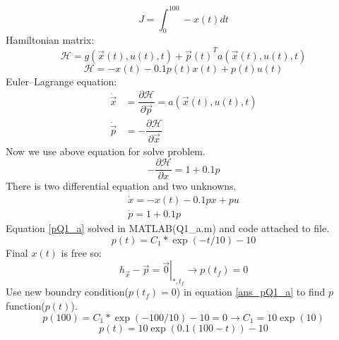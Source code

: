 $$J = \int_0^{100}-x(t)dt$$
Hamiltonian matrix:
$$\mathcal{H} =  g(\vec x(t), u(t), t) + {\vec{p}(t)}^Ta(\vec x(t), u(t), t)$$
$$\mathcal{H} = -x(t) -0.1p(t)x(t)+p(t)u(t)$$
Euler–Lagrange equation:
\begin{align}
\dot{\vec{x}} &= \dfrac{\partial \mathcal{H} }{\partial \vec{p}} = a(\vec x(t), u(t), t)\\
\dot{\vec{p}} &= -\dfrac{\partial \mathcal{H} }{\partial \vec{x}}
\end{align}
Now we use above equation for solve problem.
$$-\dfrac{\partial \mathcal{H} }{\partial x} = 1 + 0.1p$$
There is two differential equation and two unknowns.
\begin{align}
\dot x = -x(t) -0.1px+pu\\
\dot p = 1 + 0.1p\label{pQ1_a}
\end{align}
Equation \ref{pQ1_a} solved in MATLAB(Q1\_a.m) and code attached to file.
\begin{equation} \label{ans_pQ1_a}
p(t) = C_1*\exp(-t/10) - 10
\end{equation}
Final $x(t)$ is free so:
$$ \left .h_{\vec x} - \vec{p} = \vec{0} \right \vert_{*, t_f} \to p(t_f) = 0$$
Use new boundry condition($p(t_f) = 0$) in equation \ref{ans_pQ1_a} to find $p$ function($p(t)$).
$$p(100) = C_1*\exp(-100/10) - 10  = 0\to C_1 = 10\exp(10)$$
\begin{equation} \label{fullans_pQ1_a}
p(t) = 10\exp \left(0.1(100-t)\right)-10
\end{equation}



